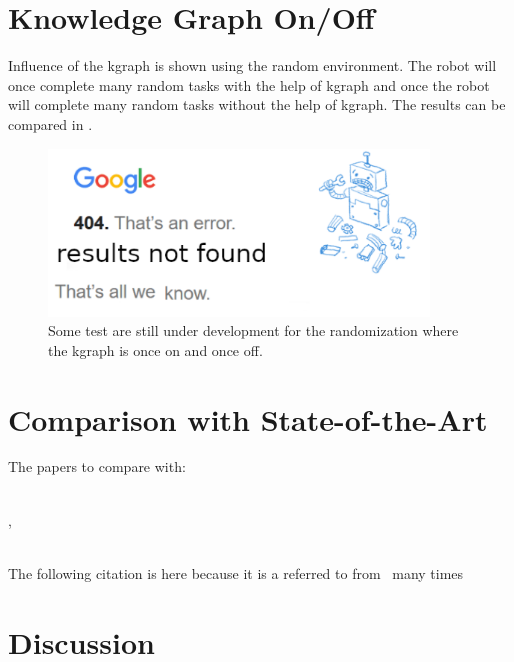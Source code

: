 
\section{Knowledge Graph On/Off}%
\label{sec:kgraph_on_off}
Influence of the \ac{kgraph} is shown using the random environment. The robot will once complete many random tasks with the help of \ac{kgraph} and once the robot will complete many random tasks without the help of \ac{kgraph}. The results can be compared in .\bs

\begin{figure}[H]
    \centering
    \includegraphics[width=0.9\textwidth]{figures/tests/404_not_found}
    \caption{Some test are still under development for the randomization where the kgraph is once on and once off.}%
    \label{fig:results_random_kgraph_on_off}
\end{figure}


\section{Comparison with State-of-the-Art}%
\label{sec:compare_with_related_papers}

The papers to compare with:\newline

\\

\cite{sabbaghnovin_model_2021},


\\
\cite{novin_dynamic_2018}
The following \cite{novin_dynamic_2018} citation is here because it is a referred to from~\cite{sabbaghnovin_model_2021} many times




\section{Discussion}%
\label{sec:discussion}
